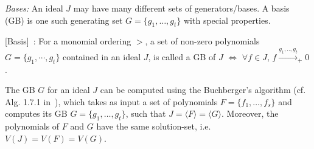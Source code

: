 

{\it \Grobner Bases:} An ideal $J$ may have many different sets of 
generators/bases. %
A \Grobner basis (GB) is one such generating set $G=\{g_1, \dots,
g_t\}$ with special properties.

\begin{Definition}
\label{def:gb}
{[\Grobner Basis]}~\cite{gb_book}: 
For a monomial ordering $>$, a set of non-zero polynomials $G =
\{g_1,\cdots,g_t\}$ contained in an ideal $J$, is called a
GB of $J$ $\iff$
$\forall f \in J$, $f\xrightarrow{g_1,..,g_t}_+0$. 
\end{Definition}
The GB $G$ for an ideal $J$ can be computed using the Buchberger's
algorithm  %
(cf. Alg. 1.7.1 in~\cite{gb_book}), which
takes as input a set of polynomials $F = \{f_1,\dots, f_s\}$ and
computes its GB $G = \{g_1,\dots,g_t\}$, such that $J = \langle
F\rangle = \langle G\rangle$. Moreover, the polynomials of $F$ and $G$
have the same solution-set, i.e. $V(J) = V(F) = V(G)$. 



